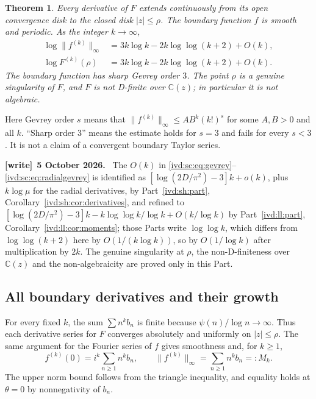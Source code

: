 \documentclass[11pt,letterpaper]{article}
\newtheorem{theorem}{Theorem}[section]
\theoremstyle{remark}\newtheorem{remark}[theorem]{Remark}
\numberwithin{equation}{section}
\newenvironment{writenote}[1][]{\par\smallskip\begingroup\small
 \noindent\textbf{[write]}\if\relax\detokenize{#1}\relax\else~\textbf{#1.}\fi\ }%
 {\par\endgroup\smallskip}
\begin{document}
\begin{theorem}\label{ivd:sc:thm:analytic}
Every derivative of $F$ extends continuously from its open convergence
disk to the closed disk $|z|\le\rho$. The boundary function $f$ is
smooth and periodic. As the integer $k\to\infty$,
\begin{align}
 \log\|f^{(k)}\|_\infty
 &=3k\log k-2k\log\log(k+2)+O(k),\label{ivd:sc:eq:gevrey}\\
 \log F^{(k)}(\rho)
 &=3k\log k-2k\log\log(k+2)+O(k).\label{ivd:sc:eq:radialgevrey}
\end{align}
The boundary function has sharp Gevrey order $3$. The point $\rho$ is
a genuine singularity of $F$, and $F$ is not D-finite over
$\mathbb C(z)$; in particular it is not algebraic.
\end{theorem}
Here Gevrey order $s$ means that
$\|f^{(k)}\|_\infty\le A B^k(k!)^s$ for some $A,B>0$ and all $k$.
``Sharp order $3$'' means the estimate holds for $s=3$ and fails for
every $s<3$. It is not a claim of a convergent boundary Taylor series.
\begin{writenote}[5 October 2026]
The $O(k)$ in \eqref{ivd:sc:eq:gevrey}--\eqref{ivd:sc:eq:radialgevrey} is identified as $[\log(2D/\pi^2)-3]k+o(k)$, plus $k\log\mu$ for the radial derivatives, by Part~\ref{ivd:sh:part}, Corollary~\ref{ivd:sh:cor:derivatives}, and refined to $[\log(2D/\pi^2)-3]k-k\log\log k/\log k+O(k/\log k)$ by Part~\ref{ivd:ll:part}, Corollary~\ref{ivd:ll:cor:moments}; those Parts write $\log\log k$, which differs from $\log\log(k+2)$ here by $O(1/(k\log k))$, so by $O(1/\log k)$ after multiplication by $2k$. The genuine singularity at $\rho$, the non-D-finiteness over $\mathbb C(z)$ and the non-algebraicity are proved only in this Part.
\end{writenote}

\subsection{All boundary derivatives and their growth}
For every fixed $k$, the sum $\sum n^k b_n$ is finite because
$\psi(n)/\log n\to\infty$. Thus each derivative series for $F$
converges absolutely and uniformly on $|z|\le\rho$. The same argument
for the Fourier series of $f$ gives smoothness and, for $k\ge1$,
\begin{equation}\label{ivd:sc:eq:momentnorm}
 f^{(k)}(0)=i^k\sum_{n\ge1}n^k b_n,\qquad
 \|f^{(k)}\|_\infty=\sum_{n\ge1}n^k b_n=:M_k.
\end{equation}
The upper norm bound follows from the triangle inequality, and equality
holds at $\theta=0$ by nonnegativity of $b_n$.
\end{document}
